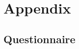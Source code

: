\documentclass[12pt]{report}
\begin{document}
\printbibliography[heading=bibnumbered]

\chapter{Appendix}
\section{Questionnaire}

\end{document}
